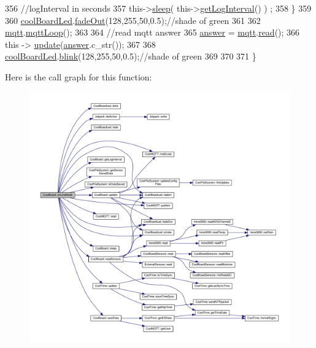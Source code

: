 \begin{DoxyCode}
356         \textcolor{comment}{//logInterval in seconds}
357         this->\hyperlink{classCoolBoard_a069952cdcb2e7f68518aa429eceadb6e}{sleep}( this->\hyperlink{classCoolBoard_a7508e029f2ee17bb747ffab599285e0d}{getLogInterval}() ) ;
358     \}
359 
360     \hyperlink{classCoolBoard_a1b1d3c684a5baa56b08486e192fd8e97}{coolBoardLed}.\hyperlink{classCoolBoardLed_a93d545679237e8cc858324367149775c}{fadeOut}(128,255,50,0.5);\textcolor{comment}{//shade of green        }
361 
362     \hyperlink{classCoolBoard_a2399f44d7c23c1149a335cb3b46d90f1}{mqtt}.\hyperlink{classCoolMQTT_aa5eaae967b562b62cbcf2b8d81f6e5d5}{mqttLoop}();
363 
364     \textcolor{comment}{//read mqtt answer}
365     \hyperlink{classCoolBoard_a7b835fafd449e5282f7f91d787a2dc15}{answer} = \hyperlink{classCoolBoard_a2399f44d7c23c1149a335cb3b46d90f1}{mqtt}.\hyperlink{classCoolMQTT_ae3c18f6ae9723746d32765f1c8f176ca}{read}();
366     \textcolor{keyword}{this} -> \hyperlink{classCoolBoard_a8612756d3f73198cdde857a66f0fe690}{update}(\hyperlink{classCoolBoard_a7b835fafd449e5282f7f91d787a2dc15}{answer}.c\_str()); 
367 
368     \hyperlink{classCoolBoard_a1b1d3c684a5baa56b08486e192fd8e97}{coolBoardLed}.\hyperlink{classCoolBoardLed_a96e1ea13003eee34c9dbcef340404426}{blink}(128,255,50,0.5);\textcolor{comment}{//shade of green    }
369 
370 
371 \}
\end{DoxyCode}
Here is the call graph for this function\+:\nopagebreak
\begin{figure}[H]
\begin{center}
\leavevmode
\includegraphics[width=350pt]{classCoolBoard_aa0bbc4bc605e35618d18e68795c61363_cgraph}
\end{center}
\end{figure}
\mbox{\label{classCoolBoard_a486507b8f0981d3cc671ed31c2145755}} 
